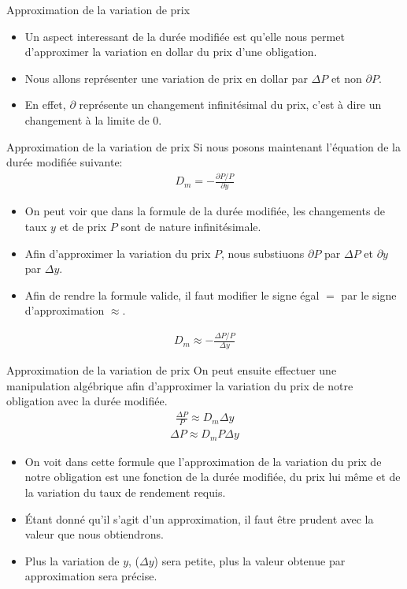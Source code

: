 \documentclass[11pt]{beamer}
\begin{document}
\begin{frame}{Approximation de la variation de prix}
\begin{itemize}
\item Un aspect interessant de la durée modifiée est qu'elle nous permet d'approximer la variation en dollar du prix d'une obligation. 
\item Nous allons représenter une variation de prix en dollar par $\Delta P$ et non $\partial P$.
\item En effet, $\partial$ représente un changement infinitésimal du prix, c'est à dire un changement à la limite de 0.
\end{itemize}
\end{frame}

\begin{frame}{Approximation de la variation de prix}
Si nous posons maintenant l'équation de la durée modifiée suivante:
\begin{align*}
D_m =-\frac{\partial P / P}{\partial y}
\end{align*}
\begin{itemize}
\item On peut voir que dans la formule de la durée modifiée,  les changements de taux $y$ et de prix $P$ sont de nature infinitésimale. 
\item Afin d'approximer la variation du prix $P$, nous substiuons $\partial P$ par $\Delta P$ et $\partial y$ par $\Delta y$.
\item Afin de rendre la formule valide,  il faut modifier le signe égal $=$ par le signe d'approximation $\approx$.
\end{itemize}
\begin{align*}
D_m \approx -\frac{\Delta P / P}{\Delta y}
\end{align*}
\end{frame}


\begin{frame}{Approximation de la variation de prix}
On peut ensuite effectuer une manipulation algébrique afin d'approximer la variation du prix de notre obligation avec la durée modifiée.
\begin{align*}
\frac{\Delta P}{P} \approx D_m \Delta y
\end{align*}
\begin{align*}
\Delta P \approx D_m P \Delta y
\end{align*}
\begin{itemize}
\item On voit dans cette formule que l'approximation de la variation du prix de notre obligation est une fonction de la durée modifiée, du prix lui même et de la variation du taux de rendement requis.
\item Étant donné qu'il s'agit d'un approximation,  il faut être prudent avec la valeur que nous obtiendrons.
\item Plus la variation de $y$, ($\Delta y$) sera petite,  plus la valeur obtenue par approximation sera précise. 
\end{itemize}
\end{frame}
\end{document}

